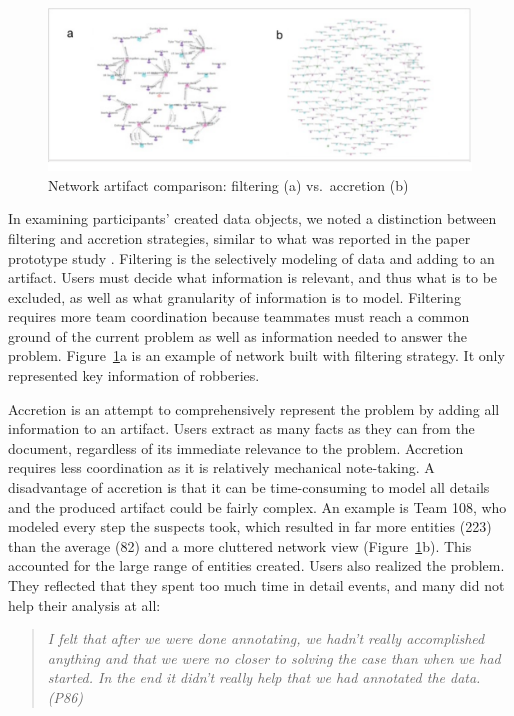 \begin{figure}
	\centering
	\includegraphics[width=\columnwidth]{./04-Study_one/img/network_accretion_filter.png}
	\caption{Network artifact comparison: filtering (a)
		vs.~accretion (b) \label{fig:network_accretion}}
\end{figure}

In examining participants' created data objects,
we noted a distinction between filtering and accretion
strategies, similar to what was reported in the paper prototype study \citep{Carroll2013}. Filtering is the selectively modeling of data
and adding to an artifact. Users must decide what information is
relevant, and thus what is to be excluded, as well as what granularity
of information is to model. Filtering requires more team coordination
because teammates must reach a common ground of the current problem as
well as information needed to answer the problem. Figure~\ref{fig:network_accretion}a is an example of network built with filtering strategy. It only represented key information of robberies.

Accretion is an attempt to comprehensively represent the problem by
adding all information to an artifact. Users extract as many facts as they can from the
document, regardless of its immediate relevance to the problem.
Accretion requires less coordination as it is relatively mechanical note-taking. A disadvantage of accretion is that it can be time-consuming
to model all details and the produced artifact could be fairly complex.
An example is Team 108, who modeled
every step the suspects took, which resulted in far more entities (223) than
the average (82) and a more cluttered network view (Figure~\ref{fig:network_accretion}b). This accounted for the large range of entities created. Users also realized the problem. They reflected that they spent too
much time in detail events, and many did not help their analysis at all:

\begin{quote}
	\emph{I felt that after we were done annotating, we hadn't really accomplished
		anything and that we were no closer to solving the case than when we had
		started. In the end it didn't really help that we had annotated the
		data. (P86)}
\end{quote}

